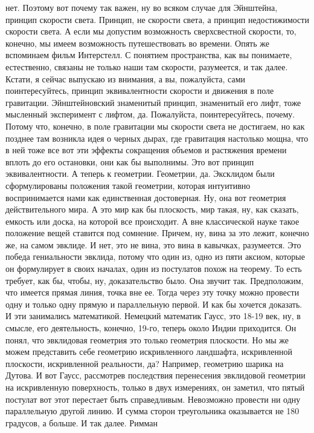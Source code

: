 нет. Поэтому вот почему так важен, ну во всяком случае для Эйнштейна, принцип
скорости света. Принцип, не скорости света, а принцип недостижимости скорости
света. А если мы допустим возможность сверхсвестной скорости, то, конечно, мы
имеем возможность путешествовать во времени. Опять же вспоминаем фильм
Интерстелл. С понятием пространства, как вы понимаете, естественно, связаны не
только наши там скорости, разумеется, и так далее. Кстати, я сейчас выпускаю из
внимания, а вы, пожалуйста, сами поинтересуйтесь, принцип эквивалентности
скорости и движения в поле гравитации. Эйнштейновский знаменитый принцип,
знаменитый его лифт, тоже мысленный эксперимент с лифтом, да. Пожалуйста,
поинтересуйтесь, почему. Потому что, конечно, в поле гравитации мы скорости
света не достигаем, но как позднее там возникла идея о черных дырах, где
гравитация настолько мощна, что в ней тоже все вот эти эффекты сокращения
объемов и растяжения времени вплоть до его остановки, они как бы выполнимы. Это
вот принцип эквивалентности. А теперь к геометрии. Геометрии, да. Эксклидом были
сформулированы положения такой геометрии, которая интуитивно воспринимается нами
как единственная достоверная. Ну, она вот геометрия действительного мира. А это
мир как бы плоскость, мир такая, ну, как сказать, емкость или доска, на которой
все происходит. А вне классической науке такое положение вещей ставится под
сомнение. Причем, ну, вина за это лежит, конечно же, на самом эвклиде. И нет,
это не вина, это вина в кавычках, разумеется. Это победа гениальности эвклида,
потому что один из, одно из пяти аксиом, которые он формулирует в своих началах,
один из постулатов похож на теорему. То есть требует, как бы, чтобы, ну,
доказательство было. Она звучит так. Предположим, что имеется прямая линия,
точка вне ее. Тогда через эту точку можно провести одну и только одну прямую и
параллельную первой. И как бы хочется доказать. И эти занимались математикой.
Немецкий математик Гаусс, это 18-19 век, ну, в смысле, его деятельность,
конечно, 19-го, теперь около Индии приходится. Он понял, что эвклидовая
геометрия это только геометрия плоскости. Но мы же можем представить себе
геометрию искривленного ландшафта, искривленной плоскости, искривленной
реальности, да? Например, геометрию шарика на Дутова. И вот Гаусс, рассмотрев
последствия перенесения эвклидовой геометрии на искривленную поверхность, только
в двух измерениях, он заметил, что пятый постулат вот этот перестает быть
справедливым. Невозможно провести ни одну параллельную другой линию. И сумма
сторон треугольника оказывается не 180 градусов, а больше. И так далее. Римман
